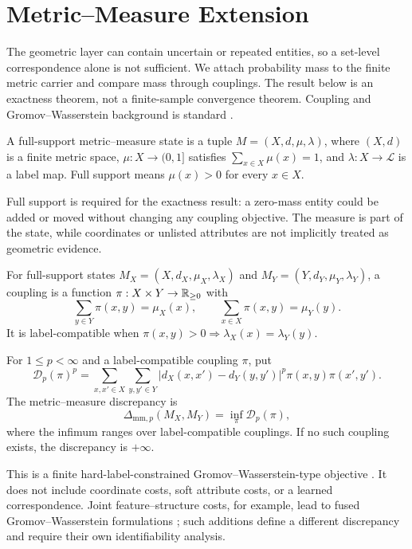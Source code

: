 \section{Metric--Measure Extension}

The geometric layer can contain uncertain or repeated entities, so a set-level
correspondence alone is not sufficient. We attach probability mass to the
finite metric carrier and compare mass through couplings. The result below is
an exactness theorem, not a finite-sample convergence theorem. Coupling and
Gromov--Wasserstein background is standard
\cite{memoli2011gromov,villani2009optimal,peyre2019computational}.

\begin{definition}
A full-support metric--measure state is a tuple
$M=(X,d,\mu,\lambda)$, where $(X,d)$ is a finite metric space,
$\mu:X\to(0,1]$ satisfies $\sum_{x\in X}\mu(x)=1$, and
$\lambda:X\to\mathcal L$ is a label map. Full support means
$\mu(x)>0$ for every $x\in X$.
\end{definition}

Full support is required for the exactness result: a zero-mass entity could be
added or moved without changing any coupling objective. The measure is part of
the state, while coordinates or unlisted attributes are not implicitly treated
as geometric evidence.

\begin{definition}
For full-support states $M_X=(X,d_X,\mu_X,\lambda_X)$ and
$M_Y=(Y,d_Y,\mu_Y,\lambda_Y)$, a coupling is a function
$\pi:X\times Y\to\mathbb{R}_{\geq0}$ with
\[
 \sum_{y\in Y}\pi(x,y)=\mu_X(x),
 \qquad
 \sum_{x\in X}\pi(x,y)=\mu_Y(y).
\]
It is label-compatible when
$\pi(x,y)>0\Rightarrow\lambda_X(x)=\lambda_Y(y)$.
\end{definition}

\begin{definition}
For $1\leq p<\infty$ and a label-compatible coupling $\pi$, put
\[
 \mathcal D_p(\pi)^p
 =
 \sum_{x,x'\in X}\sum_{y,y'\in Y}
 |d_X(x,x')-d_Y(y,y')|^p
 \pi(x,y)\pi(x',y').
\]
The metric--measure discrepancy is
\[
 \Delta_{\mathrm{mm},p}(M_X,M_Y)
 =\inf_{\pi}\mathcal D_p(\pi),
\]
where the infimum ranges over label-compatible couplings. If no such coupling
exists, the discrepancy is $+\infty$.
\end{definition}

This is a finite hard-label-constrained Gromov--Wasserstein-type objective
\cite{memoli2011gromov}.
It does not include coordinate costs, soft attribute costs, or a learned
correspondence. Joint feature--structure costs, for example, lead to fused
Gromov--Wasserstein formulations \cite{vayer2020fused}; such additions define a
different discrepancy and require their own identifiability analysis.

